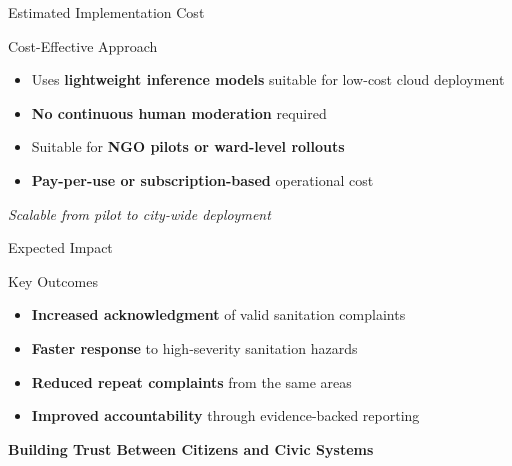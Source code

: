 \documentclass[aspectratio=169]{beamer}
\begin{document}
\begin{frame}{Estimated Implementation Cost}

\begin{block}{Cost-Effective Approach}
\begin{itemize}
    \item Uses \textbf{lightweight inference models} suitable for low-cost cloud deployment
    \vspace{0.3cm}
    \item \textbf{No continuous human moderation} required
    \vspace{0.3cm}
    \item Suitable for \textbf{NGO pilots or ward-level rollouts}
    \vspace{0.3cm}
    \item \textbf{Pay-per-use or subscription-based} operational cost
\end{itemize}
\end{block}

\vspace{0.5cm}

\begin{center}
\textit{Scalable from pilot to city-wide deployment}
\end{center}

\end{frame}

\begin{frame}{Expected Impact}

\begin{block}{Key Outcomes}
\begin{itemize}
    \item \textbf{Increased acknowledgment} of valid sanitation complaints
    \vspace{0.3cm}
    \item \textbf{Faster response} to high-severity sanitation hazards
    \vspace{0.3cm}
    \item \textbf{Reduced repeat complaints} from the same areas
    \vspace{0.3cm}
    \item \textbf{Improved accountability} through evidence-backed reporting
\end{itemize}
\end{block}

\vspace{0.5cm}

\begin{center}
\Large{\textbf{\color{secondarygreen}Building Trust Between Citizens and Civic Systems}}
\end{center}

\end{frame}
\end{document}
